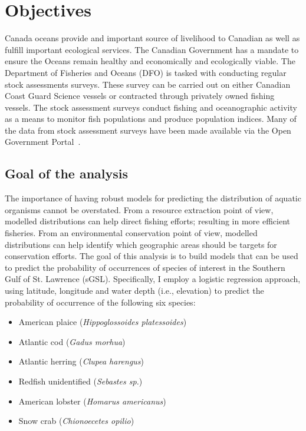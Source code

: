 \section{Objectives}

Canada oceans provide and important source of livelihood to Canadian as well as fulfill important ecological services.
The Canadian Government has a mandate to ensure the Oceans remain healthy and economically and ecologically viable.
The Department of Fisheries and Oceans (DFO) is tasked with conducting regular stock assessments surveys.
These survey can be carried out on either Canadian Coast Guard Science vessels or contracted through privately owned fishing vessels.
The stock assessment surveys conduct fishing and oceanographic activity as a means to monitor fish populations and produce population indices.
Many of the data from stock assessment surveys have been made available via the Open Government Portal~\cite{ogp}.

\subsection{Goal of the analysis}

The importance of having robust models for predicting the distribution of aquatic organisms cannot be overstated.
From a resource extraction point of view, modelled distributions can help direct fishing efforts; resulting in more efficient fisheries.
From an environmental conservation point of view, modelled distributions can help identify which geographic areas should be targets for conservation efforts.
The goal of this analysis is to build models that can be used to predict the probability of occurrences of species of interest in the Southern Gulf of St. Lawrence (sGSL).
Specifically, I employ a logistic regression approach, using latitude, longitude and water depth (i.e., elevation) to predict the probability of occurrence of the following six species:


\begin{itemize}
    \item American plaice (\textit{Hippoglossoides platessoides})
    \item Atlantic cod (\textit{Gadus morhua})
    \item Atlantic herring (\textit{Clupea harengus})
    \item Redfish unidentified (\textit{Sebastes sp.})
    \item American lobster (\textit{Homarus americanus})
    \item Snow crab (\textit{Chionoecetes opilio})
\end{itemize}

